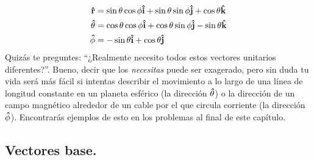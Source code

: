 \documentclass[hidelinks,12pt]{article}
\begin{document}
\begin{align}
\begin{aligned}
    \vu{r} &= \sin \theta \cos \phi \vu{i} + \sin \theta \sin \phi \vu{j} + \cos \theta \vu{k} \\
    \vu{\theta} &= \cos \theta \cos \phi \vu{i} + \cos \theta \sin \phi \vu{j} - \sin \theta \vu{k} \\
    \vu{\phi} &= - \sin \theta \vu{i} + \cos \theta \vu{j}
\end{aligned}
\label{eq:ecuacion_01_17}
\end{align}
Quizás te preguntes: \enquote{¿Realmente necesito todos estos vectores unitarios diferentes?}. Bueno, decir que los \textit{necesitas} puede ser exagerado, pero sin duda tu vida será más fácil si intentas describir el movimiento a lo largo de una línea de longitud constante en un planeta esférico (la dirección $\vu{\theta}$) o la dirección de un campo magnético alrededor de un cable por el que circula corriente (la dirección $\vu{\phi}$). Encontrarás ejemplos de esto en los problemas al final de este capítulo.

\subsection{Vectores base.}
\end{document}
